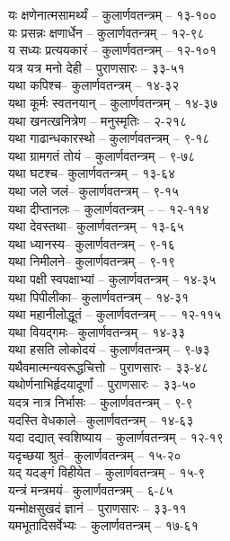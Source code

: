 \begin{raggedright}
\begin{parcolumns}[colwidths={1=.55\textwidth,2=.55\textwidth}]{2}
{यः क्षणेनात्मसामर्थ्यं	– 	कुलार्णवतन्त्रम्  – १३-१००\\
यः प्रसन्नः क्षणार्धेन	– 	कुलार्णवतन्त्रम्  – १२-९८\\
य सध्यः प्रत्ययकारं	– 	कुलार्णवतन्त्रम्  – १२-१०१\\
यत्र यत्र मनो देही	– 	पुराणसारः   – ३३-५१\\
यथा कपिश्च– 	कुलार्णवतन्त्रम्  – १४-३२\\
यथा कूर्मः स्वतनयान्	– 	कुलार्णवतन्त्रम्  – १४-३७\\
यथा खनत्खनित्रेण	– 	मनुस्मृतिः  – २-२१८\\
यथा गाढान्धकारस्थो	– 	कुलार्णवतन्त्रम्  – ९-१८\\
यथा ग्रामगतं तोयं	–  कुलार्णवतन्त्रम्  – ९-७८\\
यथा घटश्च– 	कुलार्णवतन्त्रम्  – १३-६४\\
यथा जले जलं– 	कुलार्णवतन्त्रम्  – ९-१५\\
यथा दीप्तानलः	– 	कुलार्णवतन्त्रम्  – 	– १२-११४\\
यथा देवस्तथा– 	कुलार्णवतन्त्रम्  – १३-६५\\
यथा ध्यानस्य– 	कुलार्णवतन्त्रम्  – ९-१६\\
यथा निमीलने– 	कुलार्णवतन्त्रम्  – ९-१९\\
यथा पक्षी स्वपक्षाभ्यां	– 	कुलार्णवतन्त्रम्  – १४-३५\\
यथा पिपीलीका– 	कुलार्णवतन्त्रम्  – १४-३१\\
यथा महानीलोद्धूतं –  कुलार्णवतन्त्रम्  – 	– 	१२-११५\\
यथा वियद्गमः– 	कुलार्णवतन्त्रम्  – १४-३३\\
यथा हसति लोकोदयं	– 	कुलार्णवतन्त्रम्  – ९-७३\\
यथैवमात्मन्यवरूद्धचित्तो	– 	पुराणसारः   – ३३-४८	\\
यथोर्णनाभिर्हृदयादूर्णां	– 	पुराणसारः   – ३३-५०	\\
यदत्र नात्र निर्भासः	– 	कुलार्णवतन्त्रम्  – ९-९\\
यदस्ति वेधकाले– 	कुलार्णवतन्त्रम्  – १४-६३\\
यदा दद्यात् स्वशिष्याय	– 	कुलार्णवतन्त्रम्  – १२-१९\\
यदृच्छया श्रुतं– 	कुलार्णवतन्त्रम्  – १५-२०\\
यद् यदङ्गं विहीयेत	– 	कुलार्णवतन्त्रम्  – १५-९\\
यन्त्रं मन्त्रमयं– 	कुलार्णवतन्त्रम्  – ६-८५\\
यन्मोक्षसुखदं ज्ञानं	– 	पुराणसारः   – ३३-११	\\
यमभूतादिसर्वेभ्यः	– 	कुलार्णवतन्त्रम्  – १७-६१	\\
}
\end{parcolumns}
\end{raggedright}
